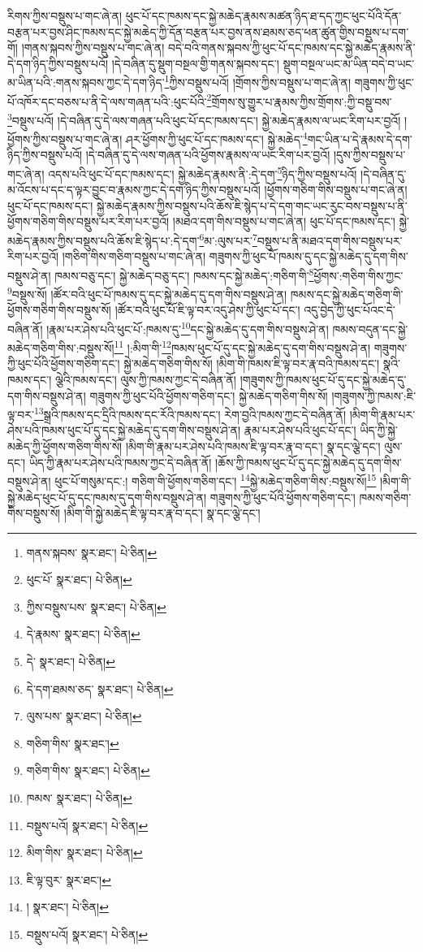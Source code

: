 རིགས་ཀྱིས་བསྡུས་པ་གང་ཞེ་ན། ཕུང་པོ་དང་ཁམས་དང་སྐྱེ་མཆེད་རྣམས་མཚན་ཉིད་ཐ་དད་ཀྱང་ཕུང་པོའི་དོན་བརྩན་པར་བྱས་ཤིང་ཁམས་དང་སྐྱེ་མཆེད་ཀྱི་དོན་བརྩན་པར་བྱས་ནས་ཐམས་ཅད་ཕན་ཚུན་གྱིས་བསྡུས་པ་དག་གོ། །གནས་སྐབས་ཀྱིས་བསྡུས་པ་གང་ཞེ་ན། བདེ་བའི་གནས་སྐབས་ཀྱི་ཕུང་པོ་དང་ཁམས་དང་སྐྱེ་མཆེད་རྣམས་ནི་དེ་དག་ཉིད་ཀྱིས་བསྡུས་པའོ། །དེ་བཞིན་དུ་སྡུག་བསྔལ་གྱི་གནས་སྐབས་དང་། སྡུག་བསྔལ་ཡང་མ་ཡིན་བདེ་བ་ཡང་མ་ཡིན་པའི་:གནས་སྐབས་ཀྱང་དེ་དག་ཉིད་\footnote{གནས་སྐབས་  སྣར་ཐང་།  པེ་ཅིན། }ཀྱིས་བསྡུས་པའོ། །གྲོགས་ཀྱིས་བསྡུས་པ་གང་ཞེ་ན། གཟུགས་ཀྱི་ཕུང་པོ་འཁོར་དང་བཅས་པ་ནི་དེ་ལས་གཞན་པའི་:ཕུང་པོའི་\footnote{ཕུང་པོ་  སྣར་ཐང་།  པེ་ཅིན། }གྲོགས་སུ་གྱུར་པ་རྣམས་ཀྱིས་གྲོགས་:ཀྱི་བསྡུ་བས་\footnote{ཀྱིས་བསྡུས་པས་  སྣར་ཐང་།  པེ་ཅིན། }བསྡུས་པའོ། །དེ་བཞིན་དུ་དེ་ལས་གཞན་པའི་ཕུང་པོ་དང་ཁམས་དང་། སྐྱེ་མཆེད་རྣམས་ལ་ཡང་རིག་པར་བྱའོ། །ཕྱོགས་ཀྱིས་བསྡུས་པ་གང་ཞེ་ན། ཤར་ཕྱོགས་ཀྱི་ཕུང་པོ་དང་ཁམས་དང་། སྐྱེ་མཆེད་\footnote{དེ་རྣམས་  སྣར་ཐང་།  པེ་ཅིན། }གང་ཡིན་པ་དེ་རྣམས་དེ་དག་ཉིད་ཀྱིས་བསྡུས་པའོ། །དེ་བཞིན་དུ་དེ་ལས་གཞན་པའི་ཕྱོགས་རྣམས་ལ་ཡང་རིག་པར་བྱའོ། །དུས་ཀྱིས་བསྡུས་པ་གང་ཞེ་ན། འདས་པའི་ཕུང་པོ་དང་ཁམས་དང་། སྐྱེ་མཆེད་རྣམས་ནི་:དེ་དག་\footnote{དེ་  སྣར་ཐང་།  པེ་ཅིན། }ཉིད་ཀྱིས་བསྡུས་པའོ། །དེ་བཞིན་དུ་མ་འོངས་པ་དང་ད་ལྟར་བྱུང་བ་རྣམས་ཀྱང་དེ་དག་ཉིད་ཀྱིས་བསྡུས་པའོ། །ཕྱོགས་གཅིག་གིས་བསྡུས་པ་གང་ཞེ་ན། ཕུང་པོ་དང་ཁམས་དང་། སྐྱེ་མཆེད་རྣམས་ཀྱིས་བསྡུས་པའི་ཆོས་ཇི་སྙེད་པ་དེ་དག་གང་ཡང་རུང་བས་བསྡུས་པ་ནི་ཕྱོགས་གཅིག་གིས་བསྡུས་པར་རིག་པར་བྱའོ། །མཐའ་དག་གིས་བསྡུས་པ་གང་ཞེ་ན། ཕུང་པོ་དང་ཁམས་དང་། སྐྱེ་མཆེད་རྣམས་ཀྱིས་བསྡུས་པའི་ཆོས་ཇི་སྙེད་པ་:དེ་དག་\footnote{དེ་དག་ཐམས་ཅད་  སྣར་ཐང་།  པེ་ཅིན། }མ་:ལུས་པར་\footnote{ལུས་པས་  སྣར་ཐང་།  པེ་ཅིན། }བསྡུས་པ་ནི་མཐའ་དག་གིས་བསྡུས་པར་རིག་པར་བྱའོ། །གཅིག་གིས་གཅིག་བསྡུས་པ་གང་ཞེ་ན། གཟུགས་ཀྱི་ཕུང་པོ་ཁམས་དུ་དང་སྐྱེ་མཆེད་དུ་དག་གིས་བསྡུས་ཤེ་ན། ཁམས་བཅུ་དང་། སྐྱེ་མཆེད་བཅུ་དང་། ཁམས་དང་སྐྱེ་མཆེད་:གཅིག་གི་\footnote{གཅིག་གིས་  སྣར་ཐང་། }ཕྱོགས་:གཅིག་གིས་ཀྱང་\footnote{གཅིག་གིས་  སྣར་ཐང་།  པེ་ཅིན། }བསྡུས་སོ། །ཚོར་བའི་ཕུང་པོ་ཁམས་དུ་དང་སྐྱེ་མཆེད་དུ་དག་གིས་བསྡུས་ཤེ་ན། ཁམས་དང་སྐྱེ་མཆེད་གཅིག་གི་ཕྱོགས་གཅིག་གིས་བསྡུས་སོ། །ཚོར་བའི་ཕུང་པོ་ཇི་ལྟ་བར་འདུ་ཤེས་ཀྱི་ཕུང་པོ་དང་། འདུ་བྱེད་ཀྱི་ཕུང་པོའང་དེ་བཞིན་ནོ། །རྣམ་པར་ཤེས་པའི་ཕུང་པོ་:ཁམས་དུ་\footnote{ཁམས་  སྣར་ཐང་།  པེ་ཅིན། }དང་སྐྱེ་མཆེད་དུ་དག་གིས་བསྡུས་ཤེ་ན། ཁམས་བདུན་དང་སྐྱེ་མཆེད་གཅིག་གིས་:བསྡུས་སོ།\footnote{བསྡུས་པའོ།  སྣར་ཐང་།  པེ་ཅིན། } །:མིག་གི་\footnote{མིག་གིས་  སྣར་ཐང་།  པེ་ཅིན། }ཁམས་ཕུང་པོ་དུ་དང་སྐྱེ་མཆེད་དུ་དག་གིས་བསྡུས་ཤེ་ན། གཟུགས་ཀྱི་ཕུང་པོའི་ཕྱོགས་གཅིག་དང་། སྐྱེ་མཆེད་གཅིག་གིས་སོ། །མིག་གི་ཁམས་ཇི་ལྟ་བར་རྣ་བའི་ཁམས་དང་། སྣའི་ཁམས་དང་། ལྕེའི་ཁམས་དང་། ལུས་ཀྱི་ཁམས་ཀྱང་དེ་བཞིན་ནོ། །གཟུགས་ཀྱི་ཁམས་ཕུང་པོ་དུ་དང་སྐྱེ་མཆེད་དུ་དག་གིས་བསྡུས་ཤེ་ན། གཟུགས་ཀྱི་ཕུང་པོའི་ཕྱོགས་གཅིག་དང་། སྐྱེ་མཆེད་གཅིག་གིས་སོ། །གཟུགས་ཀྱི་ཁམས་:ཇི་ལྟ་བར་\footnote{ཇི་ལྟ་བུར་  སྣར་ཐང་། }སྒྲའི་ཁམས་དང་དྲིའི་ཁམས་དང་རོའི་ཁམས་དང་། རེག་བྱའི་ཁམས་ཀྱང་དེ་བཞིན་ནོ། །མིག་གི་རྣམ་པར་ཤེས་པའི་ཁམས་ཕུང་པོ་དུ་དང་སྐྱེ་མཆེད་དུ་དག་གིས་བསྡུས་ཤེ་ན། རྣམ་པར་ཤེས་པའི་ཕུང་པོ་དང་། ཡིད་ཀྱི་སྐྱེ་མཆེད་ཀྱི་ཕྱོགས་གཅིག་གིས་སོ། །མིག་གི་རྣམ་པར་ཤེས་པའི་ཁམས་ཇི་ལྟ་བར་རྣ་བ་དང་། སྣ་དང་ལྕེ་དང་། ལུས་དང་། ཡིད་ཀྱི་རྣམ་པར་ཤེས་པའི་ཁམས་ཀྱང་དེ་བཞིན་ནོ། །ཆོས་ཀྱི་ཁམས་ཕུང་པོ་དུ་དང་སྐྱེ་མཆེད་དུ་དག་གིས་བསྡུས་ཤེ་ན། ཕུང་པོ་གསུམ་དང་:། གཅིག་གི་ཕྱོགས་གཅིག་དང་། \footnote{།    སྣར་ཐང་།  པེ་ཅིན། }སྐྱེ་མཆེད་གཅིག་གིས་:བསྡུས་སོ།\footnote{བསྡུས་པའོ།  སྣར་ཐང་།  པེ་ཅིན། } །མིག་གི་སྐྱེ་མཆེད་ཕུང་པོ་དུ་དང་ཁམས་དུ་དག་གིས་བསྡུས་ཤེ་ན། གཟུགས་ཀྱི་ཕུང་པོའི་ཕྱོགས་གཅིག་དང་། ཁམས་གཅིག་གིས་བསྡུས་སོ། །མིག་གི་སྐྱེ་མཆེད་ཇི་ལྟ་བར་རྣ་བ་དང་། སྣ་དང་ལྕེ་དང་། 